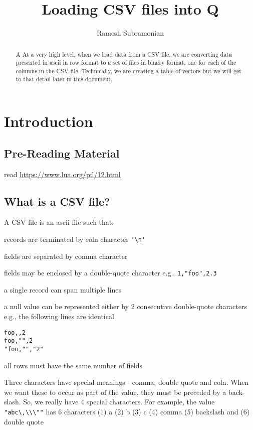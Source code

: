\documentclass[letterpaper]{article}
\begin{document}
\title{Loading CSV files into Q}
\author{ Ramesh Subramonian }
\maketitle
\thispagestyle{fancy}
\cfoot{}
\rfoot{{\small \thepage}}


\begin{abstract}
A At a very high level, when we load data from a CSV file, we are
converting data presented in ascii in row format to a set of files in
binary format, one for each of the columns in the CSV
file. Technically, we are creating a table of vectors but we will get
to that detail later in this document.
\end{abstract}

\section{Introduction}

\subsection{Pre-Reading Material}

read \url{https://www.lua.org/pil/12.html}

\subsection{What is a CSV file?}
A CSV file is an ascii file such that:

\be
\item records are terminated by eoln character \verb+'\n'+
\item fields are separated by comma character
\item fields may be enclosed by a double-quote character 
e.g., \verb+1,"foo",2.3+
\item a single record can span multiple lines
\item a null value can be represented either by 2 consecutive 
double-quote characters e.g., the following lines are identical
\begin{verbatim}
foo,,2
foo,"",2
"foo,"","2"
\end{verbatim}
\item all rows must have the same number of fields 
\item Three characters have special meanings - comma, double quote and
  eoln. When we want these to occur as part of the value, they must be
  preceded by a back-slash. So, we really have 4 special
  characters. For example, the value \verb+ "abc\,\\\""+ has 6
  characters (1) a (2) b (3) c (4) comma (5) backslash and (6) double
  quote
\end{document}
